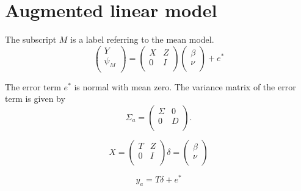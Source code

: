 \documentclass[12pt, a4paper]{article}
\begin{document}


\section{Augmented linear model}
The subscript $M$ is a label referring to the mean model.
\begin{equation}
\left(%
\begin{array}{c}
Y \\
\psi_{M} \\
\end{array}%
\right) = \left(
\begin{array}{cc}
X & Z \\
0 & I \\
\end{array}\right) \left(%
\begin{array}{c}
\beta \\
\nu \\
\end{array}%
\right)+ e^{*}
\end{equation}




The error term $e^{*}$ is normal with mean zero. The variance
matrix of the error term is given by
\begin{equation}
\Sigma_{a} = \left(%
\begin{array}{cc}
\Sigma & 0 \\
0 & D \\
\end{array}%
\right).
\end{equation}

\begin{equation}
X = \left(%
\begin{array}{cc}
T & Z \\
0 & I \\
\end{array}%
\right)
\delta = \left(%
\begin{array}{c}
\beta  \\
\nu  \\
\end{array}%
\right)
\end{equation}



\begin{equation}
y_{a} = T \delta + e^{*}
\end{equation}
\end{document}
